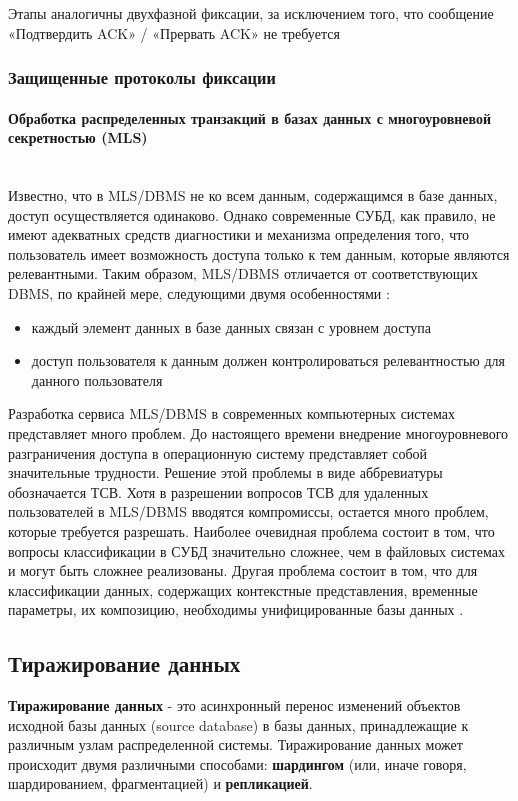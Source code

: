 Этапы аналогичны двухфазной фиксации, за исключением того, что сообщение «Подтвердить ACK» / «Прервать ACK» не требуется

\subsubsection{Защищенные протоколы фиксации}
\paragraph{Обработка распределенных транзакций в базах данных с многоуровневой секретностью (MLS)}~\\
Известно, что в MLS/DBMS не ко всем данным, содержащимся в  базе
данных, доступ осуществляется одинаково. Однако современные СУБД, как
правило,  не имеют адекватных средств диагностики и механизма определения
того, что пользователь имеет возможность доступа только  к  тем
данным,  которые являются релевантными. Таким образом, MLS/DBMS отличается
от соответствующих DBMS,  по крайней  мере,  следующими  двумя
особенностями \autocite{SecureFix}:
\begin{itemize}
    \item каждый элемент данных в базе данных связан с уровнем доступа
    \item доступ пользователя к данным должен контролироваться релевантностью для данного пользователя
\end{itemize}
Разработка сервиса MLS/DBMS в современных компьютерных  системах
представляет  много  проблем. До настоящего времени внедрение многоуровневого
разграничения доступа в операционную  систему  представляет
собой  значительные трудности. Решение этой проблемы в виде аббревиатуры
обозначается ТСВ. Хотя в разрешении вопросов ТСВ  для  удаленных
пользователей  в  MLS/DBMS вводятся компромиссы, остается много проблем,
которые требуется разрешать. Наиболее очевидная проблема состоит
в том, что вопросы классификации в СУБД значительно  сложнее,  чем  в
файловых  системах  и могут быть сложнее реализованы. Другая проблема
состоит в том, что для классификации данных,  содержащих  контекстные
представления,  временные параметры, их композицию, необходимы унифицированные базы данных \autocite{SecureFix}.

\subsection{Тиражирование данных}
\textbf{Тиражирование данных} - это асинхронный перенос изменений объектов исходной базы данных (source database)
в базы данных, принадлежащие к различным узлам распределенной системы. Тиражирование данных может происходит
двумя различными способами: \textbf{шардингом} (или, иначе говоря, шардированием, фрагментацией) и \textbf{репликацией}.

